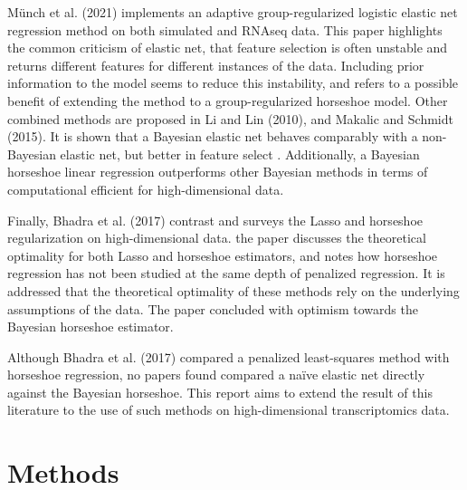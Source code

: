 \documentclass[
	a4paper, %
	10pt, %
	unnumberedsections, %
	twoside, %
]{LTJournalArticle}
\newcommand{\1}{\mathbbm{1}}
\begin{document}
Münch et al. (2021) implements an adaptive group-regularized logistic elastic net regression method on both simulated and RNAseq data. This paper highlights the common criticism of elastic net, that feature selection is often unstable and returns different features for different instances of the data. Including prior information to the model seems to reduce this instability, and refers to a possible benefit of extending the method to a group-regularized horseshoe model. Other combined methods are proposed in Li and Lin (2010), and Makalic and Schmidt (2015). It is shown that a Bayesian elastic net behaves comparably with a non-Bayesian elastic net, but better in feature select \cite{Li2010}. Additionally, a Bayesian horseshoe linear regression outperforms other Bayesian methods in terms of computational efficient for high-dimensional data. 

Finally, Bhadra et al. (2017) contrast and surveys the Lasso and horseshoe regularization on high-dimensional data. the paper discusses the theoretical optimality for both Lasso and horseshoe estimators, and notes how horseshoe regression has not been studied at the same depth of penalized regression. It is addressed that the theoretical optimality of these methods rely on the underlying assumptions of the data. The paper concluded with optimism towards the Bayesian horseshoe estimator. 

Although Bhadra et al. (2017) compared a penalized least-squares method with horseshoe regression, no papers found compared a naïve elastic net directly against the Bayesian horseshoe. This report aims to extend the result of this literature to the use of such methods on high-dimensional transcriptomics data. 

\section{Methods}
\end{document}
